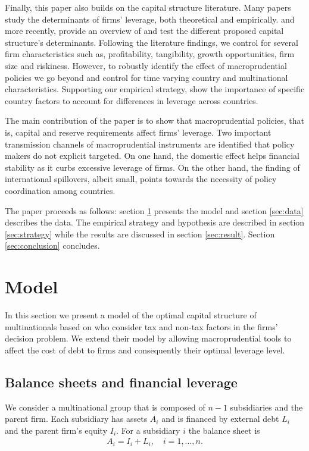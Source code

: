 \documentclass[12pt]{article}
\begin{document}
	Finally, this paper also builds on the capital structure literature. Many papers study the determinants of firms' leverage, both theoretical and empirically. \cite*{titman1988determinants} and more recently, \cite{oztekin2015capital} provide an overview of and test the different proposed capital structure's determinants. Following the literature findings, we control for several firm characteristics such as, profitability, tangibility, growth opportunities, firm size and riskiness. However, to robustly  identify the effect of macroprudential policies we go beyond and control for time varying country and multinational characteristics. Supporting our empirical strategy, \cite*{booth2001capital} show the importance of specific country factors to account for differences in leverage across countries. 
	
   The main contribution of the paper is to show that macroprudential policies, that is, capital and reserve requirements affect firms' leverage. Two important transmission channels of macroprudential instruments are identified that policy makers do not explicit targeted. On one hand, the domestic effect helps financial stability as it curbs excessive leverage of firms. On the other hand, the finding of international spillovers, albeit small, points towards the necessity of policy coordination among countries.     
	
	The paper proceeds as follows: section \ref{sec:model} presents the model and section \ref{sec:data} describes the data. The empirical strategy and hypothesis are described in section \ref{sec:strategy} while the results are discussed in section \ref{sec:result}. Section \ref{sec:conclusion} concludes. 
	
		\section{Model} \label{sec:model}
	In this section we present a model of the optimal capital structure of multinationals based on \cite{huizinga2008capital} who consider tax and non-tax factors in the firms' decision problem. We extend their model by allowing macroprudential tools to affect the cost of debt to firms and consequently their optimal leverage level.  
	\subsection{Balance sheets and financial leverage}
	\label{subsec:balancesheet}
	We consider a multinational group that is composed of $n-1$ subsidiaries and the parent firm. Each subsidiary has assets $A_i$ and is financed by external debt $L_i$ and the parent firm's equity $I_i$. For a subsidiary $i$ the balance sheet is
	\begin{equation}
	\begin{aligned}
	A_i=I_i+L_i, \quad i=1,...,n.
	\end{aligned}
	\label{eq:sub balance sheet}
	\end{equation}
	
\end{document}
